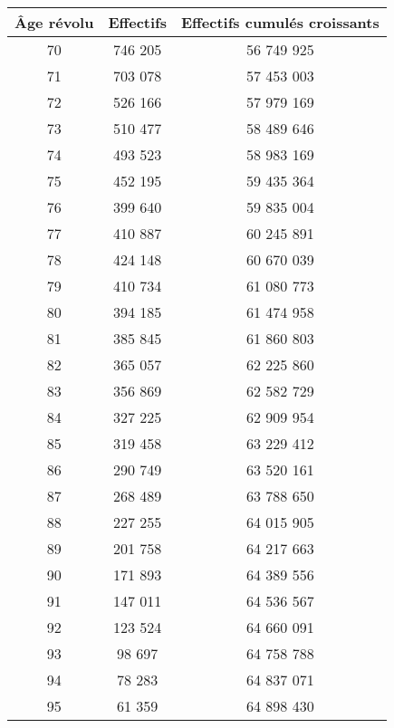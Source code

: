 \begin{center}
     \begin{tabular}{|c|c|c|}\hline %
         Âge révolu  & Effectifs  &  Effectifs cumulés croissants \\ \hline
          70  &  746 205  &  56 749 925 \\ \hline
          71  &  703 078  &  57 453 003 \\ \hline
          72  &  526 166  &  57 979 169 \\ \hline
          73  &  510 477  &  58 489 646 \\ \hline
          74  &  493 523  &  58 983 169 \\ \hline
          75  &  452 195  &  59 435 364 \\ \hline
          76  &  399 640  &  59 835 004 \\ \hline
          77  &  410 887  &  60 245 891 \\ \hline
          78  &  424 148  &  60 670 039 \\ \hline
          79  &  410 734  &  61 080 773 \\ \hline
          80  &  394 185  &  61 474 958 \\ \hline
          81  &  385 845  &  61 860 803 \\ \hline
          82  &  365 057  &  62 225 860 \\ \hline
          83  &  356 869  &  62 582 729 \\ \hline
          84  &  327 225  &  62 909 954 \\ \hline
          85  &  319 458  &  63 229 412 \\ \hline
          86  &  290 749  &  63 520 161 \\ \hline
          87  &  268 489  &  63 788 650 \\ \hline
          88  &  227 255  &  64 015 905 \\ \hline
          89  &  201 758  &  64 217 663 \\ \hline
          90  &  171 893  &  64 389 556 \\ \hline
          91  &  147 011  &  64 536 567 \\ \hline
          92  &  123 524  &  64 660 091 \\ \hline
          93  &  98 697  &  64 758 788 \\ \hline
          94  &  78 283  &  64 837 071 \\ \hline
          95  &  61 359  &  64 898 430 \\ \hline

\end{tabular}
\end{center}
